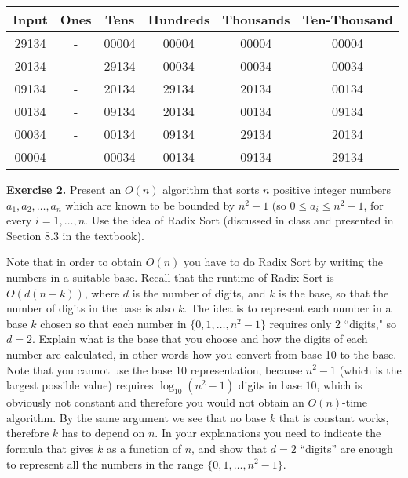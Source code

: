 \documentclass[11pt]{article}
\begin{document}
\begin{enumerate}
\begin{center}
    
\begin{tabular}{|c c c c c c |} 
 \hline
 Input & Ones & Tens & Hundreds & Thousands & Ten-Thousand \\ 
 \hline\hline
 29134 & - & 00004 & 00004 &    00004 &  00004  \\ 
\hline
 20134 & - &29134 &   00034 & 00034 & 00034 \\ 
 \hline
 09134  & - & 20134  &29134 &  20134  &  00134  \\ 
 \hline
 00134 & - & 09134   & 20134&  00134 & 09134 \\ 
 \hline
 00034 & - & 00134& 09134  & 29134 &  20134  \\ 
  \hline
  00004 & - &  00034  & 00134 &  09134 &  29134 \\ 
  \hline
\end{tabular}
\end{center}

\end{enumerate}

\textbf{Exercise 2.} Present an $O(n)$ algorithm that sorts $n$ positive integer numbers  $a_1, a_2, \ldots, a_n$ which are known to be bounded by $n^2-1$ (so $0 \leq a_i \leq n^2-1$, for every $i=1, \ldots, n$. Use the idea of Radix Sort  (discussed in class and presented in Section 8.3 in the textbook).

Note that in order to obtain $O(n)$ you have to do Radix Sort by writing the numbers in a suitable base.  Recall that the runtime of Radix Sort is $O(d (n+k))$, where $d$ is the number of digits, and $k$ is the base, so that the number of digits in the base is also $k$. The idea is to represent each number in a base $k$ chosen so that  each number in $\{0,1, \ldots, n^2-1\}$  requires only $2$ ``digits," so $d=2$.   Explain what is the base that you choose and  how the digits of each number are calculated, in other words how you convert from base 10 to the base.  Note that you cannot use the base 10 representation, because $n^2-1$ (which is the largest possible value) requires $\log_{10} (n^2-1)$ digits in base $10$, which is obviously not constant and therefore you would not obtain an $O(n)$-time algorithm.   By the same argument we see that no base $k$ that is constant works, therefore $k$ has to depend on $n$.   In your explanations you need to indicate the formula that gives $k$ as a function of $n$, and show that $d=2$ ``digits'' are enough to represent all the numbers in the range $\{0,1, \ldots, n^2-1\}$.
\end{document}

